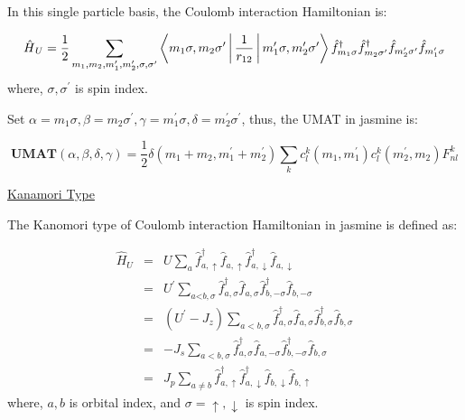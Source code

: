 In this single particle basis, the Coulomb interaction Hamiltonian is:

\begin{equation}
\text{\ensuremath{\hat{H}}}_{U}=\frac{1}{2}\sum_{m_{1},m_{2},m_{1}^{\prime},m_{2}^{\prime},\sigma,\sigma^{\prime}}\Braket{m_{1}\sigma,m_{2}\sigma^{\prime}|\frac{1}{r_{12}}|m_{1}^{\prime}\sigma,m_{2}^{\prime}\sigma^{\prime}}\hat{f}_{m_{1}\sigma}^{\dagger}\hat{f}_{m_{2}\sigma^{\prime}}^{\dagger}\hat{f}_{m_{2}^{\prime}\sigma^{\prime}}\hat{f}_{m_{1}^{\prime}\sigma}
\end{equation}
where, $\sigma,\sigma^{\prime}$ is spin index.

Set $\alpha=m_{1}\sigma,\beta=m_{2}\sigma^{\prime},\gamma=m_{1}^{\prime}\sigma,\delta=m_{2}^{\prime}\sigma^{\prime}$, thus, the UMAT in jasmine is:

\begin{equation}
\textbf{UMAT}(\alpha,\beta,\delta,\gamma)=\frac{1}{2}\delta(m_{1}+m_{2},m_{1}^{\prime}+m_{2}^{\prime})\sum_{k}c_{l}^{k}(m_{1},m_{1}^{\prime})c_{l}^{k}(m_{2}^{\prime},m_{2})F_{nl}^{k}
\end{equation}


\underline{Kanamori Type}

The Kanomori type of Coulomb interaction Hamiltonian in jasmine is defined as:

\begin{eqnarray}
\hat{H}_{U} & = & U\sum_{a}\hat{f}_{a,\uparrow}^{\dagger}\hat{f}_{a,\uparrow}\hat{f}_{a,\downarrow}^{\dagger}\hat{f}_{a,\downarrow}\nonumber\\
 & = & U^{\prime}\sum_{a\text{<}b,\sigma}\hat{f}_{a,\sigma}^{\dagger}\hat{f}_{a,\sigma}\hat{f}_{b,-\sigma}^{\dagger}\hat{f}_{b,-\sigma}\nonumber\\
 & = & (U^{\prime}-J_{z})\sum_{a<b,\sigma}\hat{f}_{a,\sigma}^{\dagger}\hat{f}_{a,\sigma}\hat{f}_{b,\sigma}^{\dagger}\hat{f}_{b,\sigma}\nonumber\\
 & = & -J_{s}\sum_{a<b,\sigma}\hat{f}_{a,\sigma}^{\dagger}\hat{f}_{a,-\sigma}\hat{f}_{b,-\sigma}^{\dagger}\hat{f}_{b,\sigma}\nonumber\\
 & = & J_{p}\sum_{a\neq b}\hat{f}_{a,\uparrow}^{\dagger}\hat{f}_{a,\downarrow}^{\dagger}\hat{f}_{b,\downarrow}\hat{f}_{b,\uparrow}
\end{eqnarray}
where, $a,b$ is orbital index, and $\sigma=\uparrow,\downarrow$ is spin index.


